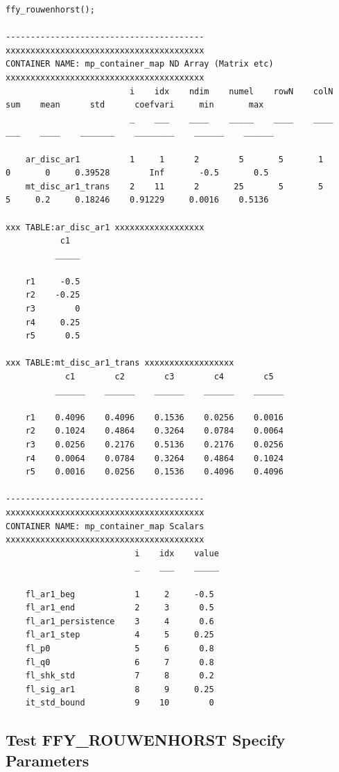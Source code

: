 \documentclass[
]{book}
\begin{document}
\begin{verbatim}
ffy_rouwenhorst();

----------------------------------------
xxxxxxxxxxxxxxxxxxxxxxxxxxxxxxxxxxxxxxxx
CONTAINER NAME: mp_container_map ND Array (Matrix etc)
xxxxxxxxxxxxxxxxxxxxxxxxxxxxxxxxxxxxxxxx
                         i    idx    ndim    numel    rowN    colN    sum    mean      std      coefvari     min       max  
                         _    ___    ____    _____    ____    ____    ___    ____    _______    ________    ______    ______

    ar_disc_ar1          1     1      2        5       5       1       0       0     0.39528        Inf       -0.5       0.5
    mt_disc_ar1_trans    2    11      2       25       5       5       5     0.2     0.18246    0.91229     0.0016    0.5136

xxx TABLE:ar_disc_ar1 xxxxxxxxxxxxxxxxxx
           c1  
          _____

    r1     -0.5
    r2    -0.25
    r3        0
    r4     0.25
    r5      0.5

xxx TABLE:mt_disc_ar1_trans xxxxxxxxxxxxxxxxxx
            c1        c2        c3        c4        c5  
          ______    ______    ______    ______    ______

    r1    0.4096    0.4096    0.1536    0.0256    0.0016
    r2    0.1024    0.4864    0.3264    0.0784    0.0064
    r3    0.0256    0.2176    0.5136    0.2176    0.0256
    r4    0.0064    0.0784    0.3264    0.4864    0.1024
    r5    0.0016    0.0256    0.1536    0.4096    0.4096

----------------------------------------
xxxxxxxxxxxxxxxxxxxxxxxxxxxxxxxxxxxxxxxx
CONTAINER NAME: mp_container_map Scalars
xxxxxxxxxxxxxxxxxxxxxxxxxxxxxxxxxxxxxxxx
                          i    idx    value
                          _    ___    _____

    fl_ar1_beg            1     2     -0.5 
    fl_ar1_end            2     3      0.5 
    fl_ar1_persistence    3     4      0.6 
    fl_ar1_step           4     5     0.25 
    fl_p0                 5     6      0.8 
    fl_q0                 6     7      0.8 
    fl_shk_std            7     8      0.2 
    fl_sig_ar1            8     9     0.25 
    it_std_bound          9    10        0 
\end{verbatim}

\hypertarget{test-ffy_rouwenhorst-specify-parameters}{%
\subsection{Test FFY\_ROUWENHORST Specify Parameters}\label{test-ffy_rouwenhorst-specify-parameters}}
\end{document}
